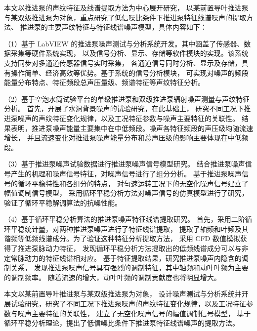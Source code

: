 本文以推进泵的声纹特征及线谱提取方法为中心展开研究，
以某前置导叶推进泵与某双级推进泵为对象，重点研究了低信噪比条件下推进泵特征线谱噪声的提取方法、
推进泵的主要声纹特征与特征线谱噪声模型，具体内容如下：

（1）基于 LabVIEW 的推进泵噪声测试与分析系统开发。其中涵盖了传感器、数据采集等硬件系统实现，
以及信号分析、显示、存储等软件模块的实现。该系统支持同步对多通道传感器信号实时采集，
各通道信号同时分析、显示及存储，具有操作简单、经济高效等优势。基于系统的信号分析模块，
可实现对噪声的频段能量分布特点、特征频段总声压量级、频谱特征等声纹特征分析。

（2）基于空泡水筒试验平台的单级推进泵和双级推进泵辐射噪声测量与声纹特征分析。
首先，开展了水洞背景噪声的试验研究，在此基础上，
研究不同工况下推进泵噪声的声纹特征变化规律，以及工况特征参数与噪声主要特征的关联性。
结果表明，推进泵噪声能量主要集中在中低频段。噪声各特征频段的声压级均随流速增长，
并且流速变化对推进泵噪声能量分布和总声压级的影响主要体现在中低频段。

（3）基于推进泵噪声试验数据进行推进泵噪声信号模型研究。
结合推进泵噪声信号产生的机理和噪声信号特征，对噪声信号进行了组分分析。
基于推进泵噪声信号的循环平稳特性和各组分的特点，
对匀速运转工况下的无空化噪声信号建立了幅值调制信号模型，
采用循环平稳分析方法对噪声信号的仿真模型进行了研究，
验证了循环平稳解调算法的抗噪性能。 

（4）基于循环平稳分析算法的推进泵噪声特征线谱提取研究。
首先，采用二阶循环平稳统计量，对两种推进泵噪声进行了特征线谱提取，
提取了轴频和叶频及其谐频等低频线谱成分。为了验证这种特征分析提取方法，
采用 CFD 数值模拟获得了推进泵脉动力特征，
发现循环平稳分析方法提取出的低频线谱成分可以与非定常脉动力的特征线谱相对应。
基于特征提取结果，研究推进泵噪声内隐含的调制关系，
发现推进泵噪声信号具有强烈的调制特征，其中轴频和动叶叶频为主要的调制频率。
随着流速的增大，动叶叶频的调制贡献度也将明显增大。

本文以某前置导叶推进泵与某双级推进泵为对象，
设计噪声测试与分析系统并开展试验研究，研究了不同工况下推进泵噪声的声纹特征变化规律，以及工况特征参数与噪声主要特征的关联性，
建立了无空化噪声信号的幅值调制信号模型，
基于循环平稳分析理论，提出了低信噪比条件下推进泵特征线谱噪声的提取方法。

\quad

